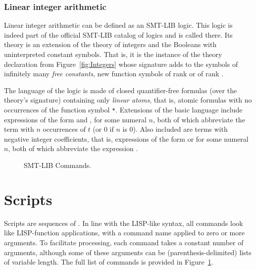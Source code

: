 \subsubsection*{Linear integer arithmetic}

Linear integer arithmetic can be defined as an SMT-LIB logic.
This logic is indeed part of the official SMT-LIB catalog of logics
and is called  there.
Its theory is an extension of the theory of integers and the Booleans 
with uninterpreted constant symbols.
That is,
it is the instance of the theory declaration  
from Figure~\ref{fig:Integers}
whose signature adds to the symbols of 
infinitely many \emph{free constants},
new function symbols of rank  or of rank .

The language of the logic is made of
closed quantifier-free formulas (over the theory's signature)
containing only \emph{linear atoms}, that is, 
atomic formulas with no occurrences of the function symbol \verb|*|.
Extensions of the basic language include 
expressions of the form  and , 
for some numeral $n$, 
both of which abbreviate the term  
with $n$ occurrences of $t$ (or 0 if $n$ is 0).
Also included are terms with negative integer coefficients, that is,
expressions of the form  or  
for some numeral $n$,
both of which abbreviate the expression .



\begin{figure}%
\small
\cCommands
\caption{SMT-LIB Commands.}
\label{fig:commands}
\end{figure}


\section{Scripts}  \label{sec:scripts}

Scripts are sequences of .  
In line with the LISP-like syntax, all commands look like 
LISP-function applications, with a command name applied to zero or more arguments.
To facilitate processing, each command takes a constant number of arguments,
although some of these arguments can be (parenthesis-delimited) lists 
of variable length.
The full list of commands is provided in Figure~\ref{fig:commands}.

